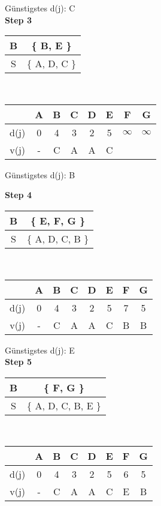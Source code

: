 \documentclass[a4paper,11pt]{article}
\begin{document}
{\begin{multicols}{2}
Günstigstes d(j): C \\

\textbf{Step 3} \\
\begin{tabular}{ |c|c| } 
  \hline
  B & \{ B, E \} \\
  \hline
  S & \{ A, D, C \} \\ 
  \hline
 \end{tabular} \\
\begin{tabular}{ |c|c|c|c|c|c|c|c| } 
  \hline
       & A & B & C & D & E & F & G \\
  \hline
  d(j) & 0 & 4 & 3 & 2 & 5 & $\infty$ & $\infty$ \\
  \hline
  v(j) & - & C & A & A & C &  &  \\
  \hline
\end{tabular}
\vspace{4mm}

Günstigstes d(j): B \\

\columnbreak

\textbf{Step 4} \\
\begin{tabular}{ |c|c| } 
  \hline
  B & \{ E, F, G \} \\
  \hline
  S & \{ A, D, C, B \} \\ 
  \hline
 \end{tabular} \\
\begin{tabular}{ |c|c|c|c|c|c|c|c| } 
  \hline
       & A & B & C & D & E & F & G \\
  \hline
  d(j) & 0 & 4 & 3 & 2 & 5 & 7 & 5 \\
  \hline
  v(j) & - & C & A & A & C & B & B \\
  \hline
\end{tabular}
\vspace{4mm}

Günstigstes d(j): E \\

\textbf{Step 5} \\
\begin{tabular}{ |c|c| } 
  \hline
  B & \{ F, G \} \\
  \hline
  S & \{ A, D, C, B, E \} \\ 
  \hline
 \end{tabular} \\
\begin{tabular}{ |c|c|c|c|c|c|c|c| } 
  \hline
       & A & B & C & D & E & F & G \\
  \hline
  d(j) & 0 & 4 & 3 & 2 & 5 & 6 & 5 \\
  \hline
  v(j) & - & C & A & A & C & E & B \\
  \hline
\end{tabular}
\vspace{4mm}


\end{multicols}}
\end{document}
